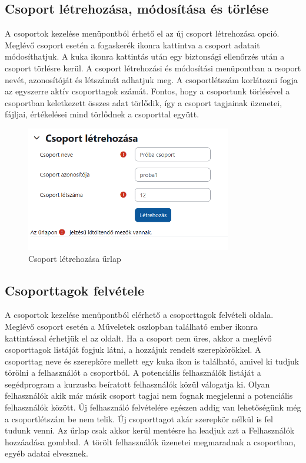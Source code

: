 \subsection{Csoport létrehozása, módosítása és törlése}

A csoportok kezelése menüpontból érhető el az új csoport létrehozása opció. Meglévő csoport esetén a fogaskerék ikonra kattintva a csoport adatait módosíthatjuk. A kuka ikonra kattintás után egy biztonsági ellenőrzés után a csoport törlésre kerül. A csoport létrehozási és módosítási menüpontban a csoport nevét, azonosítóját és létszámát adhatjuk meg. A csoportlétszám korlátozni fogja az egyszerre aktív csoporttagok számát. Fontos, hogy a csoportunk törlésével a csoportban keletkezett összes adat törlődik, így a csoport tagjainak üzenetei, fájljai, értékelései mind törlődnek a csoporttal együtt.

\begin{figure}[H]
	\centering
	\includegraphics[width=0.8\textwidth,frame]{images/csoport_letrehozas.png}
	\caption{Csoport létrehozása űrlap}
\end{figure}

\subsection{Csoporttagok felvétele}

A csoportok kezelése menüpontból elérhető a csoporttagok felvételi oldala. Meglévő csoport esetén a Műveletek oszlopban található ember ikonra kattintással érhetjük el az oldalt. Ha a csoport nem üres, akkor a meglévő csoporttagok listáját fogjuk látni, a hozzájuk rendelt szerepkörökkel. A csoporttag neve és szerepköre mellett egy kuka ikon is található, amivel ki tudjuk törölni a felhasználót a csoportból. A potenciális felhasználók listáját a segédprogram a kurzusba beíratott felhasználók közül válogatja ki. Olyan felhasználók akik már másik csoport tagjai nem fognak megjelenni a potenciális felhasználók között. Új felhasználó felvételére egészen addig van lehetőségünk még a csoportlétszám be nem telik. Új csoporttagot akár szerepkör nélkül is fel tudunk venni. Az űrlap csak akkor kerül mentésre ha leadjuk azt a Felhasználók hozzáadása gombbal. A törölt felhasználók üzenetei megmaradnak a csoportban, egyéb adatai elvesznek.

